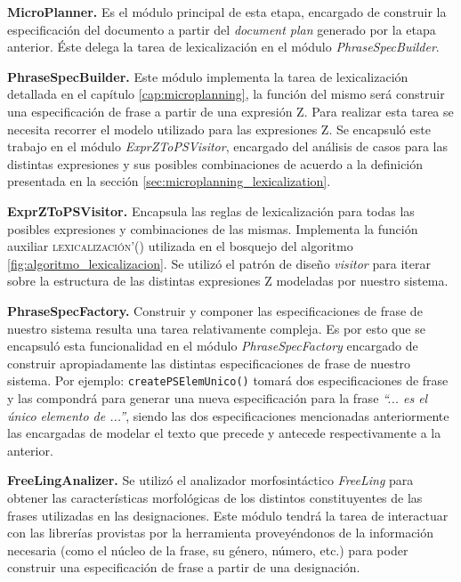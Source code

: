 \bigskip
\noindent
\textbf{MicroPlanner.} Es el módulo principal de esta etapa, encargado de construir la especificación del documento a partir del \textit{document plan} generado por la etapa anterior. Éste delega la tarea de lexicalización en el módulo \textit{PhraseSpecBuilder}.

\bigskip
\noindent
\textbf{PhraseSpecBuilder.} Este módulo implementa la tarea de lexicalización detallada en el capítulo \ref{cap:microplanning}, la función del mismo será construir una especificación de frase a partir de una expresión Z. Para realizar esta tarea se necesita recorrer el modelo utilizado para las expresiones Z. Se encapsuló este trabajo en el módulo \textit{ExprZToPSVisitor}, encargado del análisis de casos para las distintas expresiones y sus posibles combinaciones de acuerdo a la definición presentada en la sección \ref{sec:microplanning_lexicalization}.

\bigskip
\noindent
\textbf{ExprZToPSVisitor.} Encapsula las reglas de lexicalización para todas las posibles expresiones y combinaciones de las mismas. Implementa la función auxiliar \textsc{lexicalización'()} utilizada en el bosquejo del algoritmo \ref{fig:algoritmo_lexicalizacion}. Se utilizó el patrón de diseño \textit{visitor} \cite{gof} para iterar sobre la estructura de las distintas expresiones Z modeladas por nuestro sistema.

\bigskip
\noindent
\textbf{PhraseSpecFactory.} Construir y componer las especificaciones de frase de nuestro sistema resulta una tarea relativamente compleja. Es por esto que se encapsuló esta funcionalidad en el módulo \textit{PhraseSpecFactory} encargado de construir apropiadamente las distintas especificaciones de frase de nuestro sistema. Por ejemplo: \texttt{createPSElemUnico()} tomará dos especificaciones de frase y las compondrá para generar una nueva especificación para la frase \textit{``... es el único elemento de ...''}, siendo las dos especificaciones mencionadas anteriormente las encargadas de modelar el texto que precede y antecede respectivamente a la anterior.

\bigskip
\noindent
\textbf{FreeLingAnalizer.} Se utilizó el analizador morfosintáctico \textit{FreeLing} para obtener las características morfológicas de los distintos constituyentes de las frases utilizadas en las designaciones. Este módulo tendrá la tarea de interactuar con las librerías provistas por la herramienta proveyéndonos de la información necesaria (como el núcleo de la frase, su género, número, etc.) para poder construir una especificación de frase a partir de una designación.


